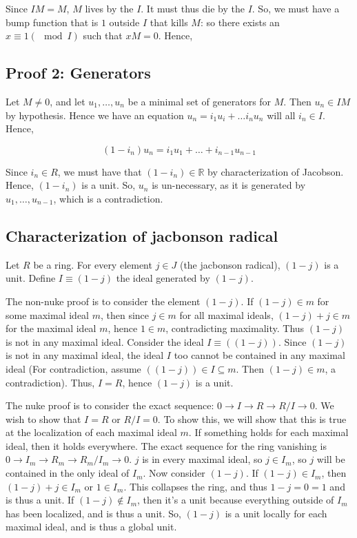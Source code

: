 \documentclass{book}
\begin{document}
Since $IM = M$, $M$ lives by the $I$. It must thus die by the $I$. So, we must have
a bump function that is $1$ outside $I$ that kills $M$: so there exists
an $x \equiv 1 (\mod I)$ such that $xM = 0$. Hence, 

\subsection{Proof 2: Generators}

Let $M \neq 0$, and let $u_1, \dots, u_n$ be a minimal set of generators for $M$. Then $u_n \in IM$ by 
hypothesis. Hence we have an equation $u_n = i_1 u_i  + \dots i_n u_n$ will all $i_n \in I$.
Hence,

$$
(1 - i_n) u_n = i_1 u_1 + \dots + i_{n-1} u_{n-1}
$$

Since $i_n \in R$, we must have that $(1 - i_n) \in \mathbb R$ by characterization of Jacobson.
Hence, $(1 - i_n)$ is a unit. So, $u_n$ is un-necessary, as it is generated by $u_1, \dots, u_{n-1}$, which is
a contradiction.


\subsection{Characterization of jacbonson radical}

Let $R$ be a ring. For every element $j \in J$ (the jacbonson radical), $(1 - j)$ is a unit.
Define $I \equiv (1 - j)$ the ideal generated by $(1 - j)$.

The non-nuke proof is to consider the element $(1 - j)$. If $(1 - j) \in m$ for some maximal ideal $m$, then
since $j \in m$ for all maximal ideals, $(1 - j) + j \in m$ for the maximal ideal $m$,
hence $1 \in m$, contradicting maximality. Thus $(1 - j)$ is not in any maximal ideal.
Consider the ideal $I \equiv ((1 - j))$. Since $(1 - j)$ is not in any maximal ideal, the
ideal $I$ too cannot be contained in any maximal ideal (For contradiction, assume $((1 - j )) \in I \subseteq m$.
Then $(1 - j) \in m$, a contradiction). Thus, $I = R$, hence $(1 - j)$ is a unit.

The nuke proof is to consider the exact sequence:
$0 \rightarrow I \rightarrow R \rightarrow R/I \rightarrow 0$. We wish to
show that $I = R$ or $R/I = 0$. To show this, we will show that this is true at the localization of
each maximal ideal $m$.  If something holds for each maximal ideal, then it holds everywhere.
The exact sequence for the ring vanishing is
$0 \rightarrow I_m \rightarrow R_m \rightarrow R_m / I_m \rightarrow 0$. $j$ is in every maximal ideal, 
so $j \in I_m$, so $j$ will be contained in the only ideal of $I_m$. Now consider $(1 - j)$. If $(1 - j) \in I_m$,
then $(1 - j) + j \in I_m$ or $1 \in I_m$. This collapses the ring, and thus $1 - j = 0 = 1$ and is thus
a unit. If $(1 - j) \not \in I_m$, then it's a unit because everything outside of $I_m$ has been localized, and is
thus a unit. So, $(1 - j)$ is a unit locally for each maximal ideal, and is thus a global unit.
\end{document}
